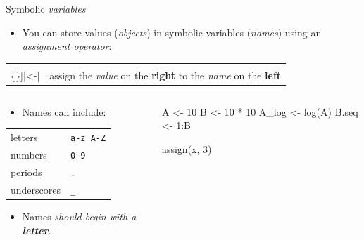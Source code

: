\documentclass[
  ignorenonframetext,
]{beamer}
\newcommand{\VERB}{\Verb[commandchars=\\\{\}]}
\newenvironment{Shaded}{\begin{snugshade}}{\end{snugshade}}
\newcommand{\DecValTok}[1]{\textcolor[rgb]{0.00,0.00,0.81}{#1}}
\newcommand{\FunctionTok}[1]{\textcolor[rgb]{0.00,0.00,0.00}{#1}}
\newcommand{\NormalTok}[1]{#1}
\newcommand{\OtherTok}[1]{\textcolor[rgb]{0.56,0.35,0.01}{#1}}
\newcommand{\SpecialCharTok}[1]{\textcolor[rgb]{0.00,0.00,0.00}{#1}}
\newcommand{\StringTok}[1]{\textcolor[rgb]{0.31,0.60,0.02}{#1}}
\providecommand{\tightlist}{%
  \setlength{\itemsep}{0pt}\setlength{\parskip}{0pt}}
\begin{document}
\begin{frame}[fragile]{Symbolic \emph{variables}}
\protect\hypertarget{symbolic-variables}{}
\begin{itemize}
\tightlist
\item
  You can store values (\emph{objects}) in symbolic variables
  (\emph{names}) using an \emph{assignment operator}:
\end{itemize}

\begin{longtable}[]{@{}ll@{}}
\toprule()
\endhead
\VERB|\OtherTok{\textless{}{-}}| & assign the \emph{value} on the
\textbf{right} to the \emph{name} on the \textbf{left} \\
\bottomrule()
\end{longtable}

\begin{columns}[T,onlytextwidth]
\begin{column}{0.48\textwidth}
\begin{itemize}
\tightlist
\item
  Names can include:
\end{itemize}

\begin{longtable}[]{@{}ll@{}}
\toprule()
\endhead
letters & \StringTok{\texttt{a-z A-Z}} \\
numbers & \StringTok{\texttt{0-9}} \\
periods & \StringTok{\texttt{.}} \\
underscores & \StringTok{\texttt{\_}} \\
\bottomrule()
\end{longtable}

\begin{itemize}
\tightlist
\item
  Names \emph{should begin with a \textbf{\StringTok{letter}}}.
\end{itemize}
\end{column}

\begin{column}{0.48\textwidth}
\begin{Shaded}
\begin{Highlighting}[]
\NormalTok{A }\OtherTok{\textless{}{-}} \DecValTok{10}
\NormalTok{B }\OtherTok{\textless{}{-}} \DecValTok{10} \SpecialCharTok{*} \DecValTok{10}
\NormalTok{A\_log }\OtherTok{\textless{}{-}} \FunctionTok{log}\NormalTok{(A)}
\NormalTok{B.seq }\OtherTok{\textless{}{-}} \DecValTok{1}\SpecialCharTok{:}\NormalTok{B}

\FunctionTok{assign}\NormalTok{(}\StringTok{\textquotesingle{}x\textquotesingle{}}\NormalTok{, }\DecValTok{3}\NormalTok{)}
\end{Highlighting}
\end{Shaded}
\end{column}
\end{columns}
\end{frame}
\end{document}
